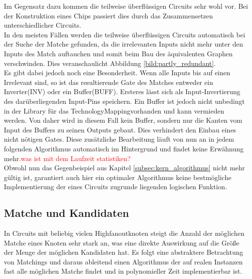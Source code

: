 \documentclass[11pt, a4paper, german]{article}
\newcommand{\TM}{TechnologyMapping}
\begin{document}
Im Gegensatz dazu kommen die teilweise überflüssigen Circuits sehr wohl vor. Bei der Konstruktion eines Chips passiert dies durch das Zusammensetzen unterschiedlicher Circuits.\\
In den meisten Fällen werden die teilweise überflüssigen Circuits automatisch bei der  Suche der Matche gefunden, da die irrelevanten Inputs nicht mehr unter den Inputs des Match auftauchen und somit beim Bau des äquivalenten Graphen verschwinden. Dies veranschaulicht Abbildung \ref{bild:partly_redundant}. \\
Es gibt dabei jedoch noch eine Besonderheit. Wenn alle Inputs bis auf einen Irrelevant sind, so ist das resultierende Gate des Matches entweder ein Inverter(INV) oder ein Buffer(BUFF). Ersteres lässt sich als Input-Invertierung des darüberliegenden Input-Pins speichern. Ein Buffer ist jedoch nicht unbedingt in der Library für das \TM vorhanden und kann vermieden werden. Von daher wird in diesem Fall kein Buffer, sondern nur die Kanten vom Input des Buffers zu seinen Outputs gebaut. Dies verhindert den Einbau eines nicht nötigen Gates. Diese zusätzliche Bearbeitung läuft von nun an in jedem folgenden Algorithmus automatisch im Hintergrund und findet keine Erwähnung mehr.\textcolor{red}{was ist mit dem Laufzeit statistiken?}\\
 Obwohl nun das Gegenbeispiel aus Kapitel \ref{subsec:kern_algorithmus} nicht mehr gültig ist, garantiert auch hier ein optimaler Algorithmus keine bestmögliche Implementierung der eines Circuits zugrunde liegenden logischen Funktion.
 
 
\subsection{Matche und Kandidaten}
\label{subsec:match_kandidaten}
In Circuits mit beliebig vielen Highfanoutknoten steigt die Anzahl der möglichen Matche eines Knoten sehr stark an, was eine direkte Auswirkung auf die Größe der Menge der möglichen Kandidaten hat. Es folgt eine abstraktere Betrachtung von Matchings und daraus ableitend einen Algorithmus der auf realen Instanzen fast alle möglichen Matche findet und in polynomieller Zeit implementierbar ist.
\end{document}
